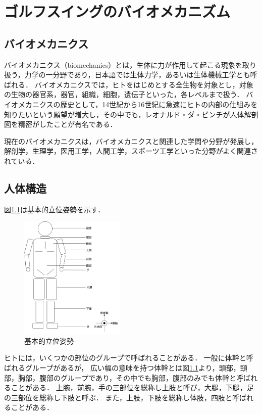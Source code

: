 \chapter{ゴルフスイングのバイオメカニズム}
\section{バイオメカニクス}
%
バイオメカニクス（biomechanics）とは，生体に力が作用して起こる現象を取り扱う，力学の一分野であり，日本語では生体力学，あるいは生体機械工学とも呼ばれる．
バイオメカニクスでは，ヒトをはじめとする全生物を対象とし，対象の生物の器官系，器官，組織，細胞，遺伝子といった，各レベルまで扱う．
バイオメカニクスの歴史として，14世紀から16世紀に急速にヒトの内部の仕組みを知りたいという願望が増大し，その中でも，レオナルド・ダ・ビンチが人体解剖図を精密がしたことが有名である．

現在のバイオメカニクスは，バイオメカニクスと関連した学問や分野が発展し，解剖学，生理学，医用工学，人間工学，スポーツ工学といった分野がよく関連されている．

\section{人体構造}
図\ref{基本的立位姿勢}は基本的立位姿勢を示す．
\begin{figure}
    \begin{center}
        \includegraphics[width = 5cm]{./images/human_body.png}
        \caption{基本的立位姿勢}
        \label{基本的立位姿勢}
    \end{center}
\end{figure}
ヒトには，いくつかの部位のグループで呼ばれることがある．
一般に体幹と呼ばれるグループがあるが，
広い幅の意味を持つ体幹とは図\ref{基本的立位姿勢}より，頭部，頸部，胸部，腹部のグループであり，その中でも胸部，腹部のみでも体幹と呼ばれることがある．
上腕，前腕，手の三部位を総称し上肢と呼び，大腿，下腿，足の三部位を総称し下肢と呼ぶ．
また，上肢，下肢を総称し体肢，四肢と呼ばれることがある．

